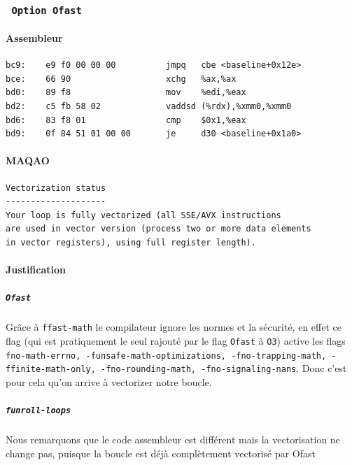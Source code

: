 \documentclass{report}
\begin{document}
      \subsubsection{ \texttt{ Option Ofast } }
      \paragraph{Assembleur}
        \begin{tcolorbox}
          \begin{verbatim}
bc9:	e9 f0 00 00 00       	jmpq   cbe <baseline+0x12e>
bce:	66 90                	xchg   %ax,%ax
bd0:	89 f8                	mov    %edi,%eax
bd2:	c5 fb 58 02          	vaddsd (%rdx),%xmm0,%xmm0
bd6:	83 f8 01             	cmp    $0x1,%eax
bd9:	0f 84 51 01 00 00    	je     d30 <baseline+0x1a0>
        \end{verbatim}
      \end{tcolorbox}
      \paragraph{MAQAO}
        \begin{tcolorbox}
          \begin{verbatim}
Vectorization status
--------------------
Your loop is fully vectorized (all SSE/AVX instructions
are used in vector version (process two or more data elements
in vector registers), using full register length).
        \end{verbatim}
      \end{tcolorbox}
	      \paragraph{Justification}
        \subparagraph{\texttt{Ofast}}
	      Grâce à \texttt{ffast-math} le compilateur ignore les normes et la sécurité, en effet ce flag
        (qui est pratiquement le seul rajouté par le flag \texttt{Ofast} à \texttt{O3}) active les flags
        \texttt{ fno-math-errno, -funsafe-math-optimizations, -fno-trapping-math, -ffinite-math-only, -fno-rounding-math, -fno-signaling-nans}.
        Donc c'est pour cela qu'on arrive à vectorizer notre boucle.
        \subparagraph{\texttt{funroll-loops}}
        Nous remarquons que le code assembleur est différent mais la vectorisation ne change pas, puisque la boucle
        est déjà complètement vectorisé par Ofast
\end{document}
